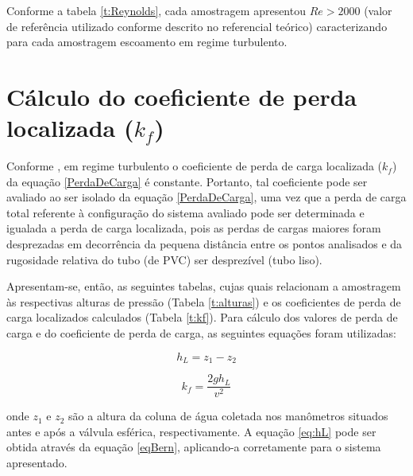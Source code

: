 Conforme a tabela \ref{t:Reynolds}, cada amostragem apresentou $Re > 2000$ (valor
de referência utilizado conforme descrito no referencial teórico) caracterizando
para cada amostragem escoamento em regime turbulento.


\section{Cálculo do coeficiente de perda localizada ($k_f$)}
\label{sec:carga}

Conforme , em regime turbulento o coeficiente de perda de
carga localizada ($k_f$) da equação \eqref{PerdaDeCarga} é constante. Portanto,
tal coeficiente pode ser avaliado ao ser isolado da equação
\eqref{PerdaDeCarga}, uma vez que a perda de carga total referente à
configuração do sistema avaliado pode ser determinada e igualada a perda de
carga localizada, pois as perdas de cargas maiores foram desprezadas em
decorrência da pequena distância entre os pontos analisados e da rugosidade
relativa do tubo (de PVC) ser desprezível (tubo liso).

Apresentam-se, então, as seguintes tabelas, cujas quais relacionam a amostragem
às respectivas alturas de pressão (Tabela \ref{t:alturas}) e os coeficientes
de perda de carga localizados calculados (Tabela \ref{t:kf}). Para cálculo dos
valores de perda de carga e do coeficiente de perda de carga, as seguintes
equações foram utilizadas:

\begin{equation}\label{eq:hL}
h_L = z_1 - z_2
\end{equation}

\begin{equation}\label{eq:kf}
  k_f = \frac{2 g h_L}{v^2}
\end{equation}

onde $z_1$ e $z_2$ são a altura da coluna de água coletada nos manômetros
situados antes e após a válvula esférica, respectivamente. A equação
\eqref{eq:hL} pode ser obtida através da equação \eqref{eqBern}, aplicando-a
corretamente para o sistema apresentado.

